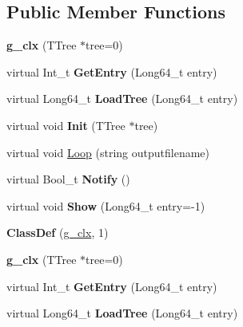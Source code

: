 \subsection*{Public Member Functions}
\begin{DoxyCompactItemize}
\item 
\mbox{\label{classg__clx_aa619daf508fe1d6bddb000af26630f31}} 
{\bfseries g\+\_\+clx} (T\+Tree $\ast$tree=0)
\item 
\mbox{\label{classg__clx_ab4c53e12e70c3671ff8895fc388dd7d2}} 
virtual Int\+\_\+t {\bfseries Get\+Entry} (Long64\+\_\+t entry)
\item 
\mbox{\label{classg__clx_a0aab3745bdb3db08757c974eebffbe39}} 
virtual Long64\+\_\+t {\bfseries Load\+Tree} (Long64\+\_\+t entry)
\item 
\mbox{\label{classg__clx_a92531261155ea15bee6b74c7e491132a}} 
virtual void {\bfseries Init} (T\+Tree $\ast$tree)
\item 
virtual void \hyperlink{classg__clx_a9d5de859df4bfbb746726661ff1d24a9}{Loop} (string outputfilename)
\item 
\mbox{\label{classg__clx_a1fe81316168bc18dc2325ca5595577a9}} 
virtual Bool\+\_\+t {\bfseries Notify} ()
\item 
\mbox{\label{classg__clx_ae86183470c7bb8db45753aa4c86f1d41}} 
virtual void {\bfseries Show} (Long64\+\_\+t entry=-\/1)
\item 
\mbox{\label{classg__clx_a8d0a8ed3a7cc55ca97aeb77f4183d3b8}} 
{\bfseries Class\+Def} (\hyperlink{classg__clx}{g\+\_\+clx}, 1)
\item 
\mbox{\label{classg__clx_aa619daf508fe1d6bddb000af26630f31}} 
{\bfseries g\+\_\+clx} (T\+Tree $\ast$tree=0)
\item 
\mbox{\label{classg__clx_ab4c53e12e70c3671ff8895fc388dd7d2}} 
virtual Int\+\_\+t {\bfseries Get\+Entry} (Long64\+\_\+t entry)
\item 
\mbox{\label{classg__clx_a0aab3745bdb3db08757c974eebffbe39}} 
virtual Long64\+\_\+t {\bfseries Load\+Tree} (Long64\+\_\+t entry)

\end{DoxyCompactItemize}
